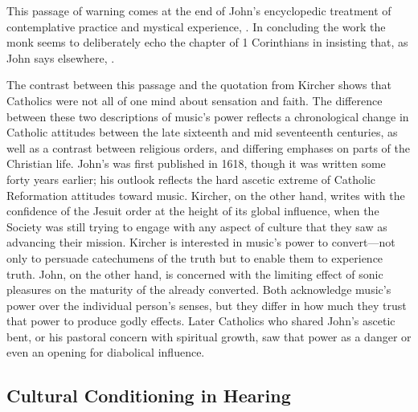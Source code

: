 This passage of warning comes at the end of John's encyclopedic treatment of
contemplative practice and mystical experience, .
In concluding the work the monk seems to deliberately echo the 
chapter of 1 Corinthians in insisting that, as John says elsewhere, .%
    \Autocite
    [, , : .]
    {JuandelaCruz:Subida}

The contrast between this passage and the quotation from Kircher shows that
Catholics were not all of one mind about sensation and faith.
The difference between these two descriptions of music's power reflects  a
chronological change in Catholic attitudes between the late sixteenth and mid
seventeenth centuries, as well as a contrast between religious orders, and
differing emphases on parts of the Christian life.
John's  was first published in 1618, though it
was written some forty years earlier; his outlook reflects the hard ascetic
extreme of Catholic Reformation attitudes toward music.
Kircher, on the other hand, writes with the confidence of the Jesuit order at
the height of its global influence, when the Society was still trying to engage
with any aspect of culture that they saw as advancing their mission.
Kircher is interested in music's power to convert---not only to persuade
catechumens of the truth but to enable them to experience truth.
John, on the other hand, is concerned with the limiting effect of sonic
pleasures on the maturity of the already converted.
Both acknowledge music's power over the individual person's senses, but they
differ in how much they trust that power to produce godly effects.
Later Catholics who shared John's ascetic bent, or his pastoral concern with
spiritual growth, saw that power as a danger or even an opening for diabolical
influence.


\subsection{Cultural Conditioning in Hearing}

